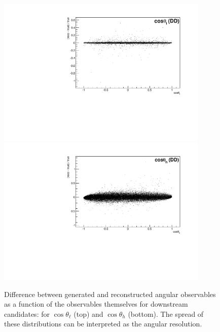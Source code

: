 %
\begin{figure}
\centering
\includegraphics[width=0.9\textwidth]{Lmumu/figs/resolution/RmT_vs_cosThetaL_DD.pdf}
\includegraphics[width=0.9\textwidth]{Lmumu/figs/resolution/RmT_vs_cosThetaB_DD.pdf}
 \caption{Difference between generated and reconstructed angular observables as a function of the 
 observables themselves for downstream candidates: for $\cos\theta_\ell$ (top) and $\cos\theta_h$ (bottom). 
 The spread of these distributions can be interpreted as the angular resolution.
 }
\label{fig:resolutionvsq2ang_DD}
\end{figure}
